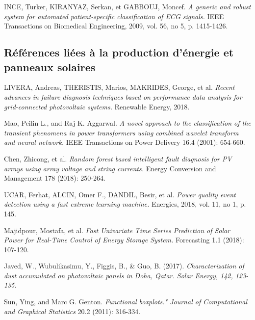 \begin{thebibliography}{1}
INCE, Turker, KIRANYAZ, Serkan, et GABBOUJ, Moncef.
\emph{A generic and robust system for automated patient-specific classification of ECG signals.} IEEE Transactions on Biomedical Engineering, 2009, vol. 56, no 5, p. 1415-1426.

\subsection*{Références liées à la production d'énergie et panneaux solaires}

LIVERA, Andreas, THERISTIS, Marios, MAKRIDES, George, et al.
\emph{Recent advances in failure diagnosis techniques based on performance data analysis for grid-connected photovoltaic systems.} Renewable Energy, 2018.

Mao, Peilin L., and Raj K. Aggarwal. 
\emph{A novel approach to the classification of the transient phenomena in power transformers using combined wavelet transform and neural network.} IEEE Transactions on Power Delivery 16.4 (2001): 654-660.

Chen, Zhicong, et al. 
\emph{Random forest based intelligent fault diagnosis for PV arrays using array voltage and string currents.} Energy Conversion and Management 178 (2018): 250-264.

UCAR, Ferhat, ALCIN, Omer F., DANDIL, Besir, et al.
\emph{Power quality event detection using a fast extreme learning machine. }
Energies, 2018, vol. 11, no 1, p. 145.

Majidpour, Mostafa, et al. 
\emph{Fast Univariate Time Series Prediction of Solar Power for Real-Time Control of Energy Storage System.} Forecasting 1.1 (2018): 107-120.

Javed, W., Wubulikasimu, Y., Figgis, B., \& Guo, B. (2017). 
\emph{Characterization of dust accumulated on photovoltaic panels in Doha, Qatar. Solar Energy, 142, 123-135.}

Sun, Ying, and Marc G. Genton. 
\emph{Functional boxplots." Journal of Computational and Graphical Statistics} 20.2 (2011): 316-334.

\end{thebibliography}	
